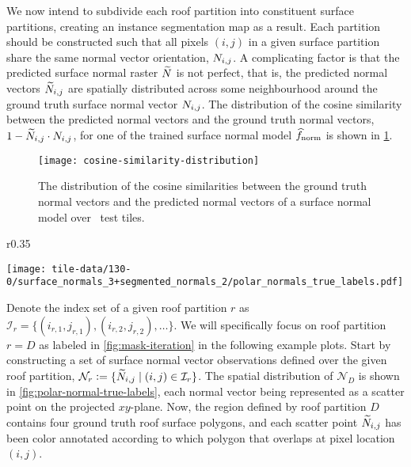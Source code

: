 We now intend to subdivide each roof partition into constituent surface partitions, creating an instance segmentation map as a result.
Each partition should be constructed such that all pixels $(i, j)$ in a given surface partition share the same normal vector orientation, $N_{i,j}$.
A complicating factor is that the predicted surface normal raster $\widetilde{N}$ is not perfect, that is, the predicted normal vectors $\widetilde{N}_{i,j}$ are spatially distributed across some neighbourhood around the ground truth surface normal vector $N_{i,j}$.
The distribution of the cosine similarity between the predicted normal vectors and the ground truth normal vectors, $1 - \widetilde{N}_{i,j} \cdot N_{i,j}$, for one of the trained surface normal model $\widehat{f}_{\mathrm{norm}}$ is shown in \cref{fig:cosine-similarity-distribution}.
\begin{figure}[H]
  \centering
  \texttt{[image: cosine-similarity-distribution]}
  \caption{%
    The distribution of the cosine similarities between the ground truth normal vectors and the predicted normal vectors of a surface normal model over \numtesttiles~test tiles.
  }%
  \label{fig:cosine-similarity-distribution}
\end{figure}
\begin{wrapfigure}[16]{r}{0.35\textwidth}
  \begin{center}
    \texttt{[image: tile-data/130-0/surface\_normals\_3+segmented\_normals\_2/polar\_normals\_true\_labels.pdf]}
  \end{center}
  \label{fig:polar-normal-true-labels}
\end{wrapfigure}
\noindent
Denote the index set of a given roof partition $r$ as $\mathcal{I}_{r} = \{(i_{r,1}, j_{r,1}), (i_{r,2}, j_{r,2}), \ldots\}$.
We will specifically focus on roof partition $r=D$ as labeled in \cref{fig:mask-iteration} in the following example plots.
Start by constructing a set of surface normal vector observations defined over the given roof partition, $\mathcal{N}_{r} \vcentcolon= \{\widetilde{N}_{i,j} \mid (i, j) \in \mathcal{I}_{r}\}$.
The spatial distribution of $\mathcal{N}_{D}$ is shown in \cref{fig:polar-normal-true-labels}, each normal vector being represented as a scatter point on the projected $xy$-plane.
Now, the region defined by roof partition $D$ contains four ground truth roof surface polygons, and each scatter point $\widetilde{N}_{i,j}$ has been color annotated according to which polygon that overlaps at pixel location $(i, j)$.

